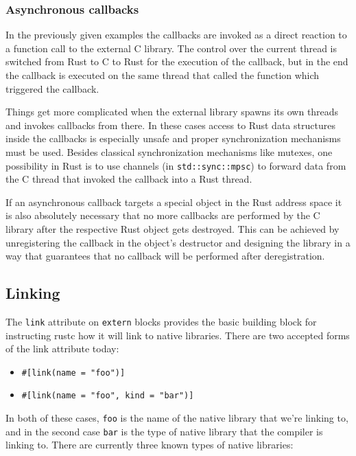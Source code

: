 \documentclass[a4paper,]{book}
\providecommand{\tightlist}{%
  \setlength{\itemsep}{0pt}\setlength{\parskip}{0pt}}
\begin{document}
\subsubsection{Asynchronous callbacks}\label{asynchronous-callbacks}

In the previously given examples the callbacks are invoked as a direct
reaction to a function call to the external C library. The control over
the current thread is switched from Rust to C to Rust for the execution
of the callback, but in the end the callback is executed on the same
thread that called the function which triggered the callback.

Things get more complicated when the external library spawns its own
threads and invokes callbacks from there. In these cases access to Rust
data structures inside the callbacks is especially unsafe and proper
synchronization mechanisms must be used. Besides classical
synchronization mechanisms like mutexes, one possibility in Rust is to
use channels (in \texttt{std::sync::mpsc}) to forward data from the C
thread that invoked the callback into a Rust thread.

If an asynchronous callback targets a special object in the Rust address
space it is also absolutely necessary that no more callbacks are
performed by the C library after the respective Rust object gets
destroyed. This can be achieved by unregistering the callback in the
object's destructor and designing the library in a way that guarantees
that no callback will be performed after deregistration.

\subsection{Linking}\label{linking}

The \texttt{link} attribute on \texttt{extern} blocks provides the basic
building block for instructing rustc how it will link to native
libraries. There are two accepted forms of the link attribute today:

\begin{itemize}
\tightlist
\item
  \texttt{\#{[}link(name\ =\ "foo"){]}}
\item
  \texttt{\#{[}link(name\ =\ "foo",\ kind\ =\ "bar"){]}}
\end{itemize}

In both of these cases, \texttt{foo} is the name of the native library
that we're linking to, and in the second case \texttt{bar} is the type
of native library that the compiler is linking to. There are currently
three known types of native libraries:
\end{document}
